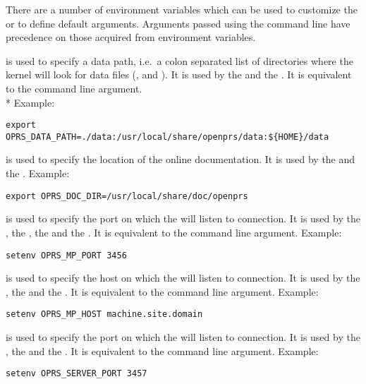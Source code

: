 There are a number of environment variables which can be used to customize the
\XPK{} or to define default arguments. Arguments passed using the command line
have precedence on those acquired from environment variables.

\begin{description}

\item[\code{OPRS\_DATA\_PATH}] is used  to specify a data path, i.e.\ a colon separated
list of directories where the kernel will look for data files (,
 and ). It is used by the \CPK{} and the \XPK{}. It is
equivalent to the  command line argument.\\*
Example:
\begin{verbatim}
export OPRS_DATA_PATH=./data:/usr/local/share/openprs/data:${HOME}/data
\end{verbatim}

\item[\code{OPRS\_DOC\_DIR}] is used  to specify the location of the online \COPRSDE{}
documentation. It is used by the \XPK{} and the \OPE{}.
Example:
\begin{verbatim}
export OPRS_DOC_DIR=/usr/local/share/doc/openprs
\end{verbatim}

\item[\code{OPRS\_MP\_PORT}] is used  to specify the port on which the \MPA{} will listen
to connection. It is used by the \CPK{}, the \XPK{}, the \OPRSS{} and the
\MPA{}. It is equivalent to the  command line argument.
Example:
\begin{verbatim}
setenv OPRS_MP_PORT 3456
\end{verbatim}

\item[\code{OPRS\_MP\_HOST}] is used  to specify the host on which the \MPA{} will
listen to connection. It is used by the \CPK{}, the \XPK{} and the
\OPRSS{}.  It is equivalent to the  command line argument.
Example:
\begin{verbatim}
setenv OPRS_MP_HOST machine.site.domain
\end{verbatim}

\item[\code{OPRS\_SERVER\_PORT}] is used  to specify the port on which the
\OPRSS{} will listen to connection. It is used by the \CPK{}, the \XPK{}
and the \OPRSS{}.  It is equivalent to the  command line argument.
Example:
\begin{verbatim}
setenv OPRS_SERVER_PORT 3457
\end{verbatim}


\end{description}
